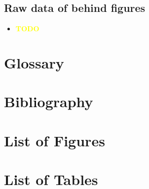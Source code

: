 \documentclass[a4paper, 10pt]{article}
\def \todo{\textbf{\textcolor{yellow}{TODO}}}
\begin{document}
\subsection{Raw data of behind figures}
\begin{itemize}
	\item \todo
\end{itemize}

\pagebreak
\section{Glossary}
\label{sec:glossary}

\pagebreak
\section{Bibliography}
\label{sec:bibliography}
\renewcommand\refname{\vskip -1cm} %
\nocite{*} %

{}

\pagebreak
\section{List of Figures}
\label{sec:figures}
\renewcommand{\listfigurename}{\vskip -1cm} %
\listoffigures

\pagebreak
\section{List of Tables}
\label{sec:tables}
\renewcommand{\listtablename}{\vskip -1cm} %
\listoftables
\end{document}
